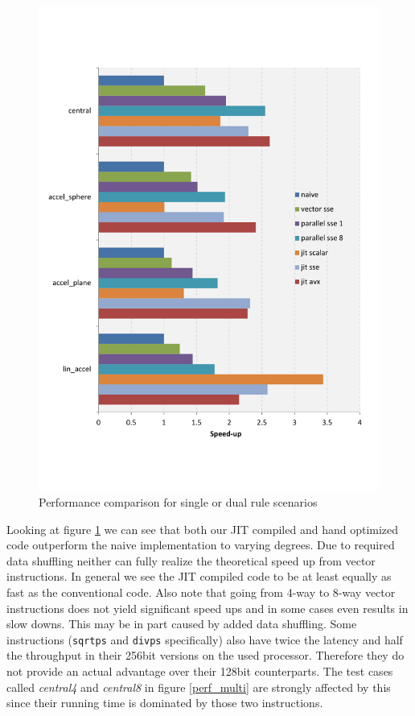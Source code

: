 \begin{figure}\centering
  \includegraphics[scale=0.6]{single_dual_rules.pdf}
  \caption{Performance comparison for single or dual rule scenarios
  \label{perf_single}}
\end{figure}

Looking at figure \ref{perf_single} we can see that both our JIT compiled and hand optimized code outperform the naive implementation to varying degrees. Due to required data shuffling neither can fully realize the theoretical speed up from vector instructions. In general we see the JIT compiled code to be at least equally as fast as the conventional code. Also note that going from 4-way to 8-way vector instructions does not yield significant speed ups and in some cases even results in slow downs. This may be in part caused by added data shuffling. Some instructions (\texttt{sqrtps} and \texttt{divps} specifically) also have twice the latency and half the throughput in their 256bit versions on the used processor. Therefore they do not provide an actual advantage over their 128bit counterparts. The test cases called \emph{central4} and \emph{central8} in figure \ref{perf_multi} are strongly affected by this since their running time is dominated by those two instructions.

